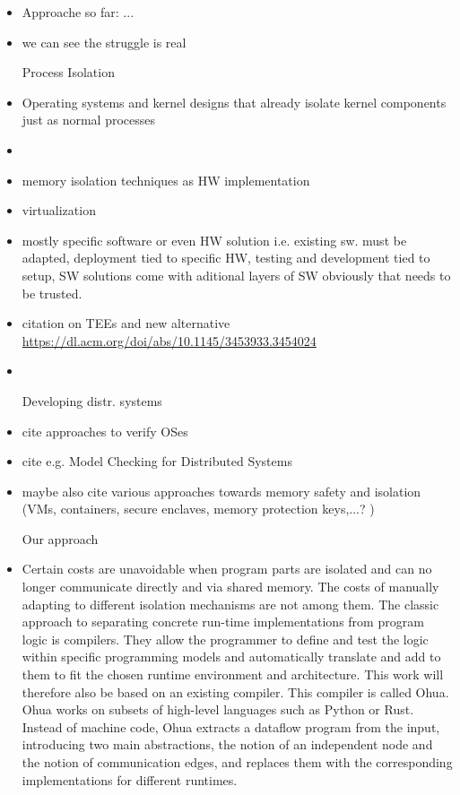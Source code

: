 \begin{itemize}
    \item Approache so far: ...
    \item we can see the struggle is real 
    \item[Process Isolation]
    \item Operating systems and kernel designs that already isolate kernel components just as normal processes
    \item {}
    \item memory isolation techniques as HW implementation 
    \item virtualization 
    \item \means mostly specific software or even HW solution i.e. existing sw. must be adapted, deployment tied to specific HW, testing and development tied to setup, SW solutions come with aditional layers of SW obviously that needs to be trusted.
    \item citation on TEEs and new alternative \url{https://dl.acm.org/doi/abs/10.1145/3453933.3454024}
    \item {}
    \item[Developing distr. systems]
    \item cite approaches to verify OSes
    \item cite e.g. Model Checking for Distributed Systems 
    \item maybe also cite various approaches towards memory safety and isolation (VMs, containers, secure enclaves, memory protection keys,...? )
    
    \item[Our approach]
    \item Certain costs are unavoidable when program parts are isolated and can no longer communicate directly and via shared memory. The costs of manually adapting to different isolation mechanisms are not among them. The classic approach to separating concrete run-time implementations from program logic is compilers. They allow the programmer to define and test the logic within specific programming models and automatically translate and add to them to fit the chosen runtime environment and architecture.
This work will therefore also be based on an existing compiler. This compiler is called Ohua. Ohua works on subsets of high-level languages such as Python or Rust. Instead of machine code, Ohua extracts a dataflow program from the input, introducing two main abstractions, the notion of an independent node and the notion of communication edges, and replaces them with the corresponding implementations for different runtimes.  


\end{itemize}
